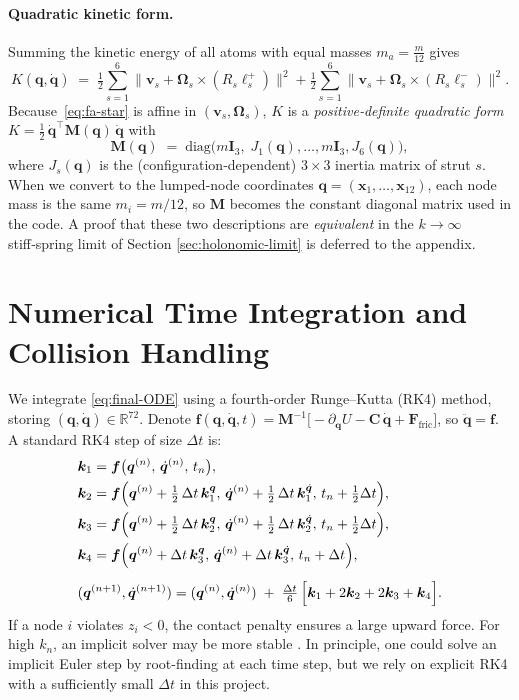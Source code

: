 \documentclass[12pt,letterpaper]{article}
\newcommand{\R}{\mathbb{R}}
\newcommand{\q}{\bm{q}}
\newcommand{\qd}{\dot{\bm{q}}}
\newcommand{\qdd}{\ddot{\bm{q}}}
\newcommand{\Mass}{\mathbf{M}}
\newcommand{\Damp}{\mathbf{C}}
\begin{document}
\paragraph{Quadratic kinetic form.}
Summing the kinetic energy of all atoms with equal masses
$m_a=\tfrac{m}{12}$ gives
\[
    K(\q,\qd)
      \;=\;
      \tfrac12\sum_{s=1}^{6}
      \bigl\|
        \bm v_s + \bm\Omega_s\times
        (R_s\bm\ell_s^{+})
      \bigr\|^2
      +
      \tfrac12\sum_{s=1}^{6}
      \bigl\|
        \bm v_s + \bm\Omega_s\times
        (R_s\bm\ell_s^{-})
      \bigr\|^2.
\]
Because~\eqref{eq:fa-star} is affine in $(\bm v_s,\bm\Omega_s)$, $K$ is a
\emph{positive‑definite quadratic form}
$K=\tfrac12\,\qd^{\!\top}\Mass(\q)\,\qd$ with
\[
    \Mass(\q)
    \;=\;
    \mathrm{diag}\!\bigl(
        m\mathbf I_3,\;J_1(\q),\dots,m\mathbf I_3,J_6(\q)
    \bigr),
\]
where $J_s(\q)$ is the (configuration‑dependent) $3\times 3$ inertia matrix
of strut $s$. When we convert to the lumped‑node coordinates
$\q=(\bm x_1,\dots,\bm x_{12})$, each node mass is the same
$m_i=m/12$, so $\Mass$ becomes the constant diagonal matrix used in the code.
A proof that these two descriptions are \emph{equivalent} in the $k\!\to\!\infty$
stiff‑spring limit of Section \ref{sec:holonomic-limit} is deferred to the appendix.

\section{Numerical Time Integration and Collision Handling}
We integrate \eqref{eq:final-ODE} using a fourth-order Runge–Kutta (RK4) method, storing $(\q,\qd)\in\R^{72}$.  Denote $\bm{f}(\q,\qd,t)=\Mass^{-1}\bigl[-\partial_{\q} U - \Damp\,\qd + \bm{F}_{\mathrm{fric}}\bigr]$, so $\qdd=\bm{f}$.  A standard RK4 step of size $\Delta t$ is:
\[
\begin{aligned}
 &\bm{k}_1 = \bm{f}\bigl(\q^{(n)},\,\qd^{(n)},\,t_n\bigr),\\
 &\bm{k}_2 = \bm{f}\Bigl(\q^{(n)}+\tfrac12\,\Delta t\,\bm{k}_1^{\q},\,
               \qd^{(n)}+\tfrac12\,\Delta t\,\bm{k}_1^{\qd},\,
               t_n+\tfrac12\Delta t\Bigr),\\
 &\bm{k}_3 = \bm{f}\Bigl(\q^{(n)}+\tfrac12\,\Delta t\,\bm{k}_2^{\q},\,
               \qd^{(n)}+\tfrac12\,\Delta t\,\bm{k}_2^{\qd},\,
               t_n+\tfrac12\Delta t\Bigr),\\
 &\bm{k}_4 = \bm{f}\Bigl(\q^{(n)}+\Delta t\,\bm{k}_3^{\q},\,
               \qd^{(n)}+\Delta t\,\bm{k}_3^{\qd},\,
               t_n+\Delta t\Bigr),\\[5pt]
 &(\q^{(n+1)},\qd^{(n+1)})
     = (\q^{(n)},\qd^{(n)})
        \;+\;\tfrac{\Delta t}{6}\,\Bigl[\bm{k}_1+2\bm{k}_2+2\bm{k}_3+\bm{k}_4\Bigr].
\end{aligned}
\]
If a node $i$ violates $z_i<0$, the contact penalty ensures a large upward force.  For high $k_n$, an implicit solver may be more stable \cite{ZhaWuKroegerPerezMueller2020IROS}. In principle, one could solve an implicit Euler step by root-finding at each time step, but we rely on explicit RK4 with a sufficiently small $\Delta t$ in this project.
\end{document}
